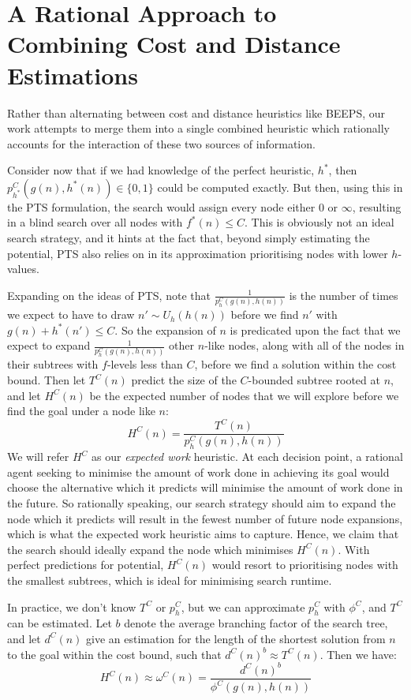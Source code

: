 \documentclass[letterpaper]{article} %
\begin{document}
\section{A Rational Approach to Combining Cost and Distance Estimations}
Rather than alternating between cost and distance heuristics like BEEPS,
our work attempts to merge them into a single combined heuristic
which rationally accounts for the interaction of these two sources of information.

Consider now that if we had knowledge of the perfect heuristic, \(h^*\),
then \(p^C_{h^*}(g(n), h^*(n)) \in \{0,1\}\) could be computed exactly.
But then, using this in the PTS formulation,
the search would assign every node either \(0\) or \(\infty\),
resulting in a blind search over all nodes with \(f^*(n) \leq C\).
This is obviously not an ideal search strategy,
and it hints at the fact that, beyond simply estimating the potential,
PTS also relies on in its approximation
prioritising nodes with lower \(h\)-values.

Expanding on the ideas of PTS, note that \(\frac{1}{p^C_h(g(n), h(n))}\) is the number of times we expect to have
to draw \(n' \sim U_h(h(n))\) before we find \(n'\) with \(g(n) + h^*(n') \leq C\).
So the expansion of \(n\) is predicated upon the fact that we expect to expand \(\frac{1}{p^C_h(g(n), h(n))}\) other \(n\)-like nodes, along with all of the nodes in their subtrees with \(f\)-levels less than \(C\), before we find a solution within the cost bound.
Then let \(T^C(n)\) predict the size of the \(C\)-bounded subtree rooted at \(n\),
and let \(H^C(n)\) be the expected number of nodes that we will explore before we find the goal
under a node like \(n\):
\[H^C(n) = \frac{T^C(n)}{p^C_h(g(n), h(n))}\]
We will refer \(H^C\) as our \textit{expected work} heuristic.
At each decision point, a rational agent seeking to minimise
the amount of work done in achieving its goal would choose
the alternative which it predicts will minimise the amount of work done in the future.
So rationally speaking, our search strategy should aim to expand the node
which it predicts will result in the fewest number of future node expansions,
which is what the expected work heuristic aims to capture.
Hence, we claim that the search should ideally expand the node which minimises \(H^C(n)\).
With perfect predictions for potential, \(H^C(n)\) would resort to prioritising
nodes with the smallest subtrees, which is ideal for minimising search runtime.

In practice, we don't know \(T^C\) or \(p^C_h\),
but we can approximate \(p^C_h\) with \(\phi^C\),
and \(T^C\) can be estimated.
Let \(b\) denote the average branching factor of the search tree,
and let \(d^C(n)\) give an estimation for the length of the shortest solution from \(n\) to the goal within the cost bound, such that \(d^C(n)^b \approx T^C(n)\).
Then we have:
\[H^C(n) \approx \omega^C(n) = \frac{d^C(n)^b}{\phi^C(g(n), h(n))}\]
\end{document}
